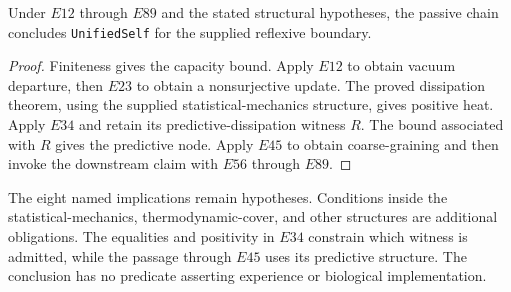 \begin{claim}
Under $E12$ through $E89$ and the stated structural hypotheses, the passive
chain concludes \texttt{UnifiedSelf} for the supplied reflexive boundary.
\end{claim}
\begin{proof}
Finiteness gives the capacity bound. Apply $E12$ to obtain vacuum departure,
then $E23$ to obtain a nonsurjective update. The proved dissipation theorem,
using the supplied statistical-mechanics structure, gives positive heat.
Apply $E34$ and retain its predictive-dissipation witness $R$. The bound
associated with $R$ gives the predictive node. Apply $E45$ to obtain
coarse-graining and then invoke the downstream claim with $E56$ through $E89$.
\end{proof}
\scope The eight named implications remain hypotheses. Conditions inside
the statistical-mechanics, thermodynamic-cover, and other structures are
additional obligations. The equalities and positivity in $E34$ constrain
which witness is admitted, while the passage through $E45$ uses its
predictive structure. The conclusion has no predicate asserting experience
or biological implementation.
